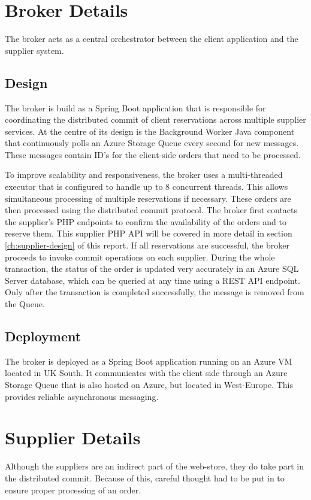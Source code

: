 \documentclass[10pt,a4paper,kul]{kulakarticle} %
\begin{document}
	\section{Broker Details}
		The broker acts as a central orchestrator between the client application and the supplier system. 
		\subsection{Design}
		The broker is build as a Spring Boot application that is responsible for coordinating the distributed commit of client reservations across multiple supplier services. At the centre of its design is the Background Worker Java component that continuously polls an Azure Storage Queue every second for new messages. These messages contain ID's for the client-side orders that need to be processed. 
		
		To improve scalability and responsiveness, the broker uses a multi-threaded executor that is configured to handle up to 8 concurrent threads. This allows simultaneous processing of multiple reservations if necessary.  These orders are then processed using the distributed commit protocol. The broker first contacts the supplier's PHP endpoints to confirm the availability of the orders and to reserve them. This supplier PHP API will be covered in more detail in section \ref{ch:supplier-design} of this report. If all reservations are successful, the broker proceeds to invoke commit operations on each supplier. During the whole transaction, the status of the order is updated very accurately in an Azure SQL Server database, which can be queried at any time using a REST API endpoint. Only after the transaction is completed successfully, the message is removed from the Queue. 
		\subsection{Deployment}
		The broker is deployed as a Spring Boot application running on an Azure VM located in UK South. It communicates with the client side through an Azure Storage Queue that is also hosted on Azure, but located in West-Europe. This provides reliable asynchronous messaging. 
	
	\section{Supplier Details}
		Although the suppliers are an indirect part of the web-store, they do take part in the distributed commit. Because of this, careful thought had to be put in to ensure proper processing of an order. 
\end{document}
